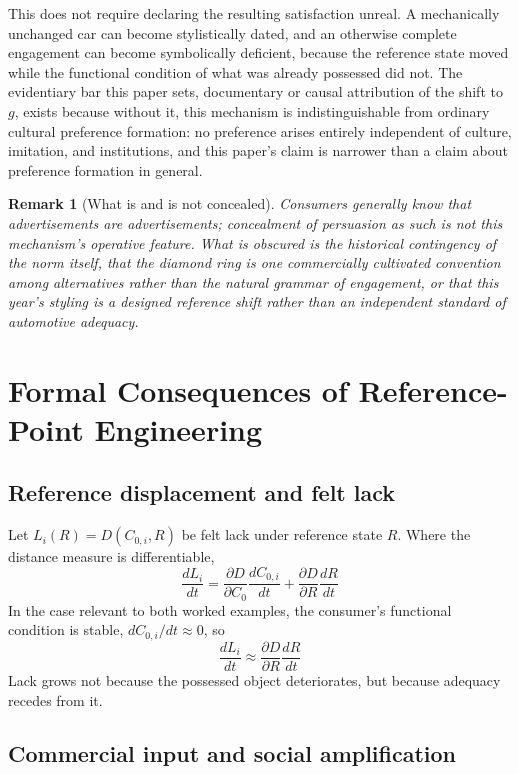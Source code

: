 \documentclass[11pt]{article}
\newtheorem{remark}[definition]{Remark}
\begin{document}
This does not require declaring the resulting satisfaction unreal. A mechanically unchanged car can become stylistically dated, and an otherwise complete engagement can become symbolically deficient, because the reference state moved while the functional condition of what was already possessed did not. The evidentiary bar this paper sets, documentary or causal attribution of the shift to $g$, exists because without it, this mechanism is indistinguishable from ordinary cultural preference formation: no preference arises entirely independent of culture, imitation, and institutions, and this paper's claim is narrower than a claim about preference formation in general.

\begin{remark}[What is and is not concealed]
Consumers generally know that advertisements are advertisements; concealment of persuasion as such is not this mechanism's operative feature. What is obscured is the historical contingency of the norm itself, that the diamond ring is one commercially cultivated convention among alternatives rather than the natural grammar of engagement, or that this year's styling is a designed reference shift rather than an independent standard of automotive adequacy.
\end{remark}

\section{Formal Consequences of Reference-Point Engineering}

\subsection{Reference displacement and felt lack}

Let $L_i(R) = D(C_{0,i}, R)$ be felt lack under reference state $R$. Where the distance measure is differentiable,
\[
\frac{dL_i}{dt} = \frac{\partial D}{\partial C_0}\frac{dC_{0,i}}{dt} + \frac{\partial D}{\partial R}\frac{dR}{dt}
\]
In the case relevant to both worked examples, the consumer's functional condition is stable, $dC_{0,i}/dt \approx 0$, so
\[
\frac{dL_i}{dt} \approx \frac{\partial D}{\partial R}\frac{dR}{dt}
\]
Lack grows not because the possessed object deteriorates, but because adequacy recedes from it.

\subsection{Commercial input and social amplification}
\end{document}
